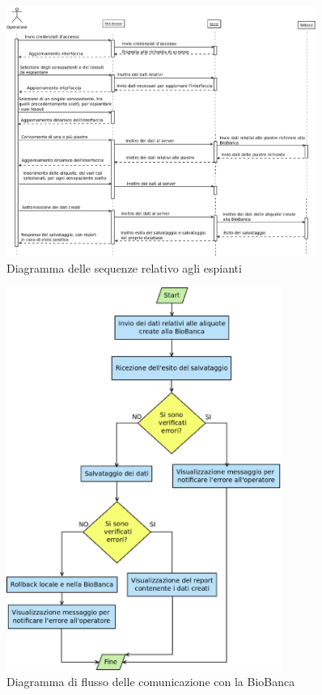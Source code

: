 \begin{figure}[h]
\begin{center}
\includegraphics[width=0.9\textwidth]{./Figure/SDexplants}
\end{center}
\caption{Diagramma delle sequenze relativo agli espianti\label{fig:SDexpl}}
\end{figure}

\begin{figure}[h]
\begin{center}
\includegraphics[width=0.8\textwidth]{./Figure/flussoExplants}
\end{center}
\caption{Diagramma di flusso delle comunicazione con la BioBanca\label{fig:flussoExpl}}
\end{figure}

